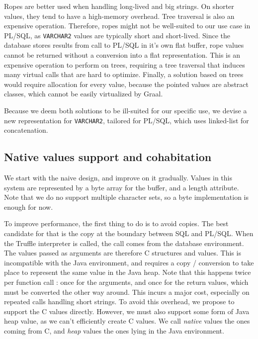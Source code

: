 \documentclass[twoside,11pt,a4paper]{article}
\newcommand{\java}[1]{\textsf{#1}}
\newcommand{\pls}[1]{\small\texttt{#1}\normalsize}
\newcommand{\plstype}[1]{\pls{#1}}
\newcommand{\varchar}{\plstype{VARCHAR2}}
\begin{document}
Ropes are better used when handling long-lived and big strings. On shorter values, they tend to have a high-memory overhead. Tree traversal is also an expensive operation. Therefore, ropes might not be well-suited to our use case in PL/SQL, as \varchar{} values are typically short and short-lived. Since the database stores results from call to PL/SQL in it's own flat buffer, rope values cannot be returned without a conversion into a flat representation. This is an expensive operation to perform on trees, requiring a tree traversal that induces many virtual calls that are hard to optimize. Finally, a solution based on trees would require allocation for every value, because the pointed values are abstract classes, which cannot be easily virtualized by Graal.

Because we deem both solutions to be ill-suited for our specific use, we devise a new representation for \varchar{}, tailored for PL/SQL, which uses linked-list for concatenation.

\subsection{Native values support and cohabitation}


We start with the naive design, and improve on it gradually. Values in this system are represented by a \java{byte} array for the buffer, and a length attribute. Note that we do no support multiple character sets, so a \java{byte} implementation is enough for now.

To improve performance, the first thing to do  is to avoid copies. The best candidate for that is the copy at the boundary between SQL and PL/SQL. When the Truffle interpreter is called, the call comes from the database environment. The values passed as arguments are therefore C structures and values. This is incompatible with the Java environment, and requires a copy / conversion to take place to represent the same value in the Java heap. Note that this happens twice per function call : once for the arguments, and once for the return values, which must be converted the other way around. This incurs a major cost, especially on repeated calls handling short strings. To avoid this overhead, we propose to support the C values directly. However, we must also support some form of Java heap value, as we can't efficiently create C values. We call \textit{native} values the ones coming from C, and \textit{heap} values the ones lying in the Java environment.
\end{document}
